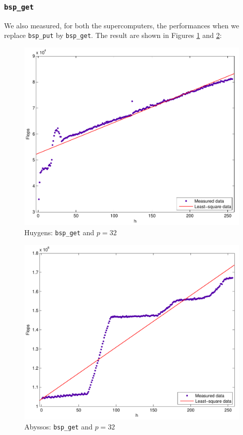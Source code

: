 \documentclass[a4paper,11pt]{article}
\begin{document}
\subsubsection{\texttt{bsp\_get}}

We also measured, for both the supercomputers, the performances when we replace \verb|bsp_put| by \verb|bsp_get|. The result are shown in Figures \ref{huy:32g} and \ref{aby:32g}:

\begin{figure}[H]
\begin{center}
\includegraphics[scale=0.6]{img/32-get}
\end{center}
\caption{Huygens: \texttt{bsp\_get} and $p=32$} \label{huy:32g}
\end{figure}


\begin{figure}[H]
\begin{center}
\includegraphics[scale=0.6]{img/abyssos-32-get}
\end{center}
\caption{Abyssos: \texttt{bsp\_get} and $p=32$} \label{aby:32g}
\end{figure}
\end{document}
